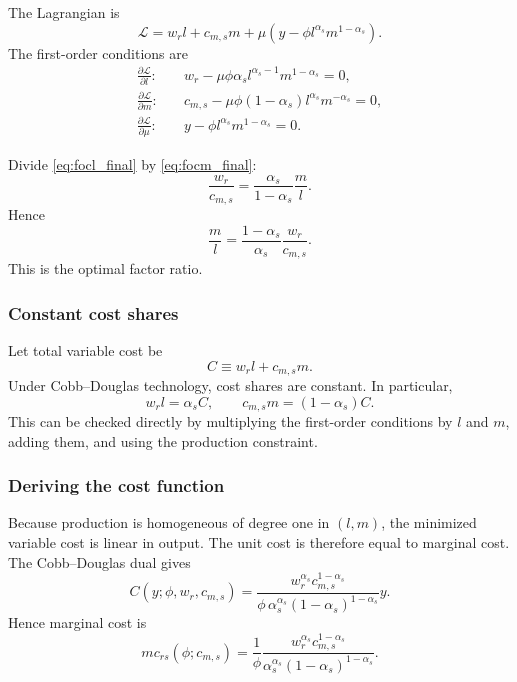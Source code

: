 \documentclass[11pt]{article}
\begin{document}
The Lagrangian is
\begin{equation}
\mathcal{L}=w_rl+c_{m,s}m+\mu\left(y-\phi l^{\alpha_s}m^{1-\alpha_s}\right).
\end{equation}
The first-order conditions are
\begin{align}
\frac{\partial \mathcal{L}}{\partial l}:\quad & w_r - \mu\phi\alpha_s l^{\alpha_s-1}m^{1-\alpha_s}=0, \label{eq:focl_final}\\
\frac{\partial \mathcal{L}}{\partial m}:\quad & c_{m,s} - \mu\phi(1-\alpha_s)l^{\alpha_s}m^{-\alpha_s}=0, \label{eq:focm_final}\\
\frac{\partial \mathcal{L}}{\partial \mu}:\quad & y-\phi l^{\alpha_s}m^{1-\alpha_s}=0. \label{eq:focmu_final}
\end{align}

Divide \eqref{eq:focl_final} by \eqref{eq:focm_final}:
\begin{equation}
\frac{w_r}{c_{m,s}} = \frac{\alpha_s}{1-\alpha_s}\frac{m}{l}.
\end{equation}
Hence
\begin{equation}
\frac{m}{l}=\frac{1-\alpha_s}{\alpha_s}\frac{w_r}{c_{m,s}}.
\label{eq:input_ratio_final}
\end{equation}
This is the optimal factor ratio.

\subsubsection{Constant cost shares}

Let total variable cost be
\begin{equation}
C \equiv w_rl+c_{m,s}m.
\end{equation}
Under Cobb--Douglas technology, cost shares are constant. In particular,
\begin{equation}
w_rl = \alpha_s C, \qquad c_{m,s}m=(1-\alpha_s)C.
\label{eq:cost_shares_final}
\end{equation}
This can be checked directly by multiplying the first-order conditions by \(l\) and \(m\), adding them, and using the production constraint.

\subsubsection{Deriving the cost function}

Because production is homogeneous of degree one in \((l,m)\), the minimized variable cost is linear in output. The unit cost is therefore equal to marginal cost. The Cobb--Douglas dual gives
\begin{equation}
C(y;\phi,w_r,c_{m,s}) = \frac{w_r^{\alpha_s}c_{m,s}^{1-\alpha_s}}{\phi\,\alpha_s^{\alpha_s}(1-\alpha_s)^{1-\alpha_s}}y.
\end{equation}
Hence marginal cost is
\begin{equation}
mc_{rs}(\phi;c_{m,s}) = \frac{1}{\phi}\frac{w_r^{\alpha_s}c_{m,s}^{1-\alpha_s}}{\alpha_s^{\alpha_s}(1-\alpha_s)^{1-\alpha_s}}.
\label{eq:mc_final}
\end{equation}
\end{document}
